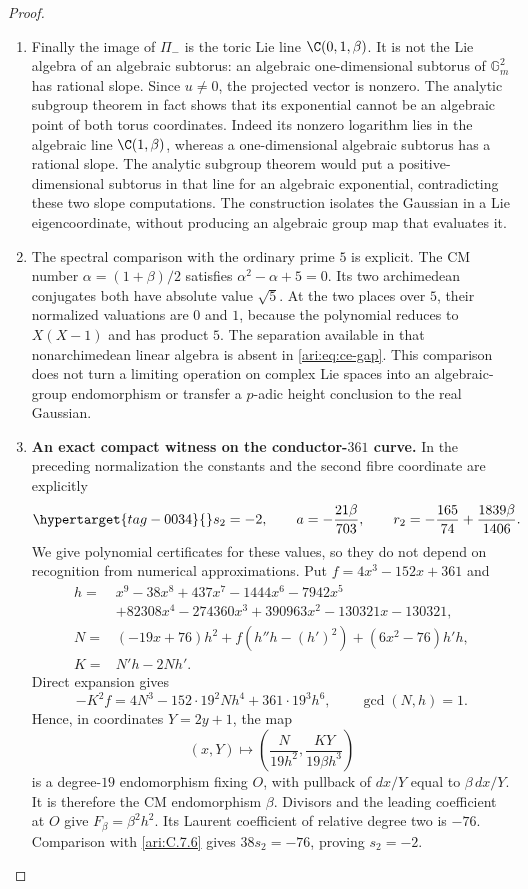 \begin{proof}
\begin{enumerate}[label=\arabic*.,leftmargin=*]
\item Finally the image of $\Pi_-$ is the toric Lie line
$\C(0,1,\beta)$. It is not the Lie algebra of an algebraic
subtorus: an algebraic one-dimensional subtorus of
$\mathbb G_m^2$ has rational slope. Since $u\ne0$,
the projected vector is nonzero. The analytic subgroup
theorem in fact shows that its exponential cannot be an
algebraic point of both torus coordinates. Indeed its nonzero logarithm lies in the algebraic line
$\C(1,\beta)$, whereas a one-dimensional algebraic subtorus
has a rational slope. The analytic subgroup theorem would put
a positive-dimensional subtorus in that line for an algebraic
exponential, contradicting these two slope computations. The construction isolates the Gaussian in
a Lie eigencoordinate, without producing an algebraic
group map that evaluates it.

\item The spectral comparison with the ordinary prime $5$ is
explicit. The CM number $\alpha=(1+\beta)/2$ satisfies
$\alpha^2-\alpha+5=0$. Its two archimedean conjugates
both have absolute value $\sqrt5$. At the two places over
$5$, their normalized valuations are $0$ and $1$, because
the polynomial reduces to $X(X-1)$ and has product $5$.
The separation available in that nonarchimedean linear
algebra is absent in \eqref{ari:eq:ce-gap}. This comparison
does not turn a limiting operation on complex Lie spaces
into an algebraic-group endomorphism or transfer a
$p$-adic height conclusion to the real Gaussian.

\item \textbf{An exact compact witness on the conductor-$361$ curve.}
In the preceding normalization the constants and the second
fibre coordinate are explicitly
\begin{equation}\hypertarget{tag-0034}{}\label{ari:eq:ce-explicit-witness}
 s_2=-2,\qquad a=-\frac{21\beta}{703},\qquad
 r_2=-\frac{165}{74}+\frac{1839\beta}{1406}.
\end{equation}
We give polynomial certificates for these values, so they
do not depend on recognition from numerical approximations.
Put $f=4x^3-152x+361$ and
\[
 \begin{aligned}
 h={}&x^9-38x^8+437x^7-1444x^6-7942x^5\\
     &+82308x^4-274360x^3+390963x^2-130321x-130321,\\
 N={}&(-19x+76)h^2+f(h''h-(h')^2)+(6x^2-76)h'h,\\
 K={}&N'h-2Nh'.
 \end{aligned}
\]
Direct expansion gives
\[
 -K^2f=4N^3-152\cdot19^2Nh^4+361\cdot19^3h^6,
 \qquad \gcd(N,h)=1.
\]
Hence, in coordinates $Y=2y+1$, the map
\[
 (x,Y)\longmapsto
 \left(\frac{N}{19h^2},\frac{KY}{19\beta h^3}\right)
\]
is a degree-$19$ endomorphism fixing $O$, with pullback of
$dx/Y$ equal to $\beta\,dx/Y$. It is therefore the CM
endomorphism $\beta$. Divisors and the leading coefficient
at $O$ give $F_\beta=\beta^2h^2$. Its Laurent coefficient
of relative degree two is $-76$. Comparison with \ref{ari:C.7.6}
gives $38s_2=-76$, proving $s_2=-2$.


\end{enumerate}
\end{proof}
